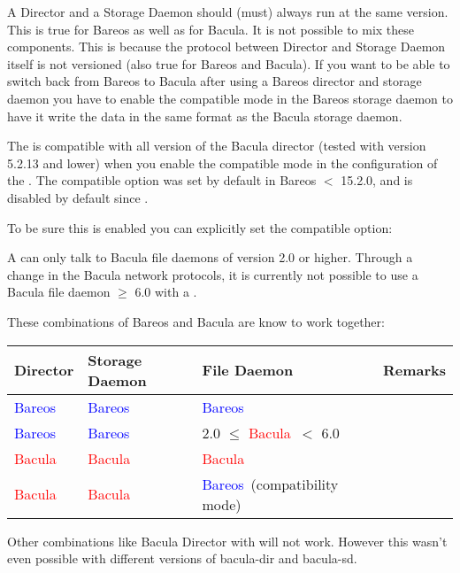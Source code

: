 A Director and a Storage Daemon should (must) always run at the same version.
This is true for Bareos as well as for Bacula.
It is not possible to mix these components.
This is because the protocol between Director and Storage Daemon itself is not versioned (also true for Bareos and Bacula).
If you want to be able to switch back from Bareos to Bacula after using a Bareos director and storage daemon
you have to enable the compatible mode in the Bareos storage daemon to have it write the data in the same
format as the Bacula storage daemon.

The \bareosFd is compatible with all version of the Bacula director (tested with version 5.2.13 and lower)
when you enable the compatible mode in the configuration of the \bareosFd.
The compatible option was set by default in Bareos $<$ 15.2.0, and is disabled by default since
.

To be sure this is enabled you can explicitly set the compatible option:


A \bareosDir can only talk to Bacula file daemons of version 2.0 or higher.
Through a change in the Bacula network protocols,
it is currently not possible to use a Bacula file daemon $\ge$ 6.0 with a \bareosDir.


\newcommand{\bareoscolor}{\textcolor{blue}{Bareos\ }}
\newcommand{\baculacolor}{\textcolor{red}{Bacula\ }}


These combinations of Bareos and Bacula are know to work together:

\begin{tabular}[h]{|l|l|l|l|}
  \hline
  \textbf{Director} & \textbf{Storage Daemon} & \textbf{File Daemon} & \textbf{Remarks} \\
  \hline
  \hline
  \bareoscolor & \bareoscolor & \bareoscolor & \\
  \hline
  \bareoscolor & \bareoscolor & 2.0 $\leq$ \baculacolor $<$ 6.0 & \\
  \hline
  \baculacolor & \baculacolor & \baculacolor & \\
  \hline
  \baculacolor & \baculacolor & \bareoscolor (compatibility mode) & \\
  \hline
\end{tabular}

Other combinations like Bacula Director with \bareosSd will not work.
However this wasn't even possible with different versions of bacula-dir and bacula-sd.

